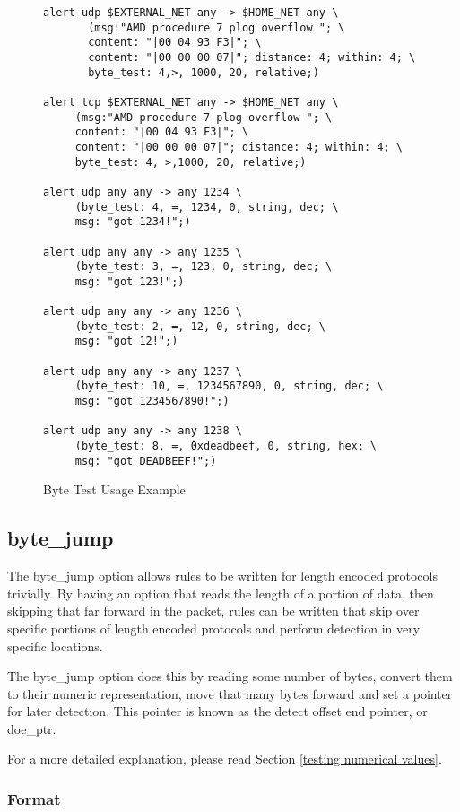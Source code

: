 \documentclass[english]{report}
\begin{document}
\begin{figure}[!hbpt]
\begin{verbatim}
alert udp $EXTERNAL_NET any -> $HOME_NET any \
       (msg:"AMD procedure 7 plog overflow "; \
       content: "|00 04 93 F3|"; \
       content: "|00 00 00 07|"; distance: 4; within: 4; \
       byte_test: 4,>, 1000, 20, relative;)

alert tcp $EXTERNAL_NET any -> $HOME_NET any \
     (msg:"AMD procedure 7 plog overflow "; \
     content: "|00 04 93 F3|"; \
     content: "|00 00 00 07|"; distance: 4; within: 4; \
     byte_test: 4, >,1000, 20, relative;)

alert udp any any -> any 1234 \
     (byte_test: 4, =, 1234, 0, string, dec; \
     msg: "got 1234!";)

alert udp any any -> any 1235 \
     (byte_test: 3, =, 123, 0, string, dec; \
     msg: "got 123!";)

alert udp any any -> any 1236 \
     (byte_test: 2, =, 12, 0, string, dec; \
     msg: "got 12!";)

alert udp any any -> any 1237 \
     (byte_test: 10, =, 1234567890, 0, string, dec; \
     msg: "got 1234567890!";)

alert udp any any -> any 1238 \
     (byte_test: 8, =, 0xdeadbeef, 0, string, hex; \
     msg: "got DEADBEEF!";)
\end{verbatim}
\caption{Byte Test Usage Example \label{fig:byte_test}}
\end{figure}

\subsection{byte\_jump\label{sub:byte_jump}}

The byte\_jump option allows rules to be written for length encoded protocols 
trivially.   By having an option that reads the length of a portion of data,
then skipping that far forward in the packet, rules can be written that skip
over specific portions of length encoded protocols and perform detection in very specific locations.

The byte\_jump option does this by reading some number of bytes, convert them
to their numeric representation, move that many bytes forward and set a pointer
for later detection.  This pointer is known as the detect offset end pointer, or doe\_ptr.

For a more detailed explanation, please read Section \ref{testing numerical values}.

\subsubsection{Format}
\end{document}
